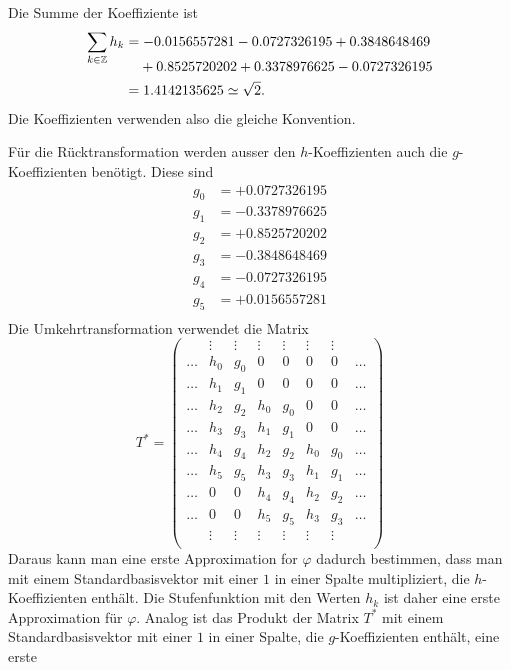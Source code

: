 \begin{loesung}
\begin{teilaufgaben}
\item
Die Summe der Koeffiziente ist
\begin{align*}
\sum_{k\in\mathbb Z}h_k
&=
-0.0156557281 -0.0727326195 + 0.3848648469\\[-8pt]
&\phantom{=\mathstrut} + 0.8525720202 + 0.3378976625 -0.0727326195
\\
&=1.4142135625
\simeq\sqrt{2}.
\end{align*}
Die Koeffizienten verwenden also die gleiche Konvention.
\item
Für die Rücktransformation werden ausser den $h$-Koeffizienten auch die
$g$-Koeffizienten benötigt.
Diese sind
\begin{align*}
g_0 &= +0.0727326195\\
g_1 &= -0.3378976625\\
g_2 &= +0.8525720202\\
g_3 &= -0.3848648469\\
g_4 &= -0.0727326195\\
g_5 &= +0.0156557281\\
\end{align*}
Die Umkehrtransformation verwendet die Matrix 
\[
T^*
=
\begin{pmatrix}
&\vdots&\vdots&\vdots&\vdots&\vdots&\vdots&\\
\dots&h_0&g_0& 0 & 0 & 0 & 0 &\dots\\
\dots&h_1&g_1& 0 & 0 & 0 & 0 &\dots\\
\dots&h_2&g_2&h_0&g_0& 0 & 0 &\dots\\
\dots&h_3&g_3&h_1&g_1& 0 & 0 &\dots\\
\dots&h_4&g_4&h_2&g_2&h_0&g_0&\dots\\
\dots&h_5&g_5&h_3&g_3&h_1&g_1&\dots\\
\dots& 0 & 0 &h_4&g_4&h_2&g_2&\dots\\
\dots& 0 & 0 &h_5&g_5&h_3&g_3&\dots\\
&\vdots&\vdots&\vdots&\vdots&\vdots&\vdots&\\
\end{pmatrix}
\]
Daraus kann man eine erste Approximation for $\varphi$ dadurch bestimmen,
dass man mit einem Standardbasisvektor mit einer $1$ in einer Spalte
multipliziert, die $h$-Koeffizienten enthält.
Die Stufenfunktion mit den Werten $h_k$ ist daher eine erste Approximation 
für $\varphi$.
Analog ist das Produkt der Matrix $T^*$ mit einem Standardbasisvektor
mit einer $1$ in einer Spalte, die $g$-Koeffizienten enthält, eine erste

\end{teilaufgaben}
\end{loesung}
